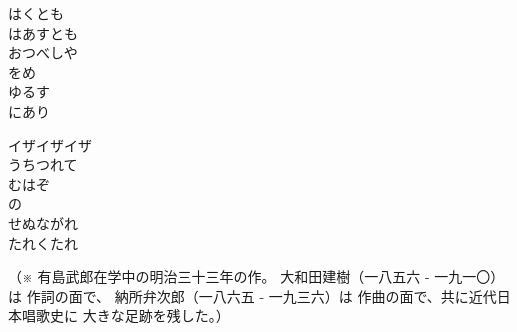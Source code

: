 \documentclass[10pt,b5j]{tarticle} %
\begin{document}
\begin{enumerate}
\begin{minipage}[c]{\blocksize}
        \vspace{\linespace}
        \item
        はくとも\\
        はあすとも\\
        おつべしや\\
        をめ\\
        ゆるす\\
        にあり
        
        \vspace{\linespace}
        \item
        イザイザイザ\\
        うちつれて\\
        むはぞ\\
        の\\
        せぬながれ\\
        たれくたれ
        
        （※
        有島武郎在学中の明治三十三年の作。
        大和田建樹（一八五六 - 一九一〇）は
        作詞の面で、
        納所弁次郎（一八六五 - 一九三六）は
        作曲の面で、共に近代日本唱歌史に
        大きな足跡を残した。）

    
    \end{minipage}
\end{enumerate} %
\end{document}
